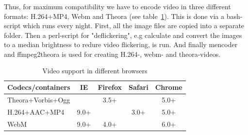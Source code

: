 Thus, for maximum compatibility we have to encode video in three different formats: H.264+MP4, Webm and Theora (see table~\ref{tab:videosupport}). This is done via a bash-script which runs every night. First, all the image files are copied into a separate folder. Then a perl-script for "deflickering", e.g calculate and convert the images to a median brightness to redure video flickering, is run. And finally mencoder and ffmpeg2theora is used for creating H.264-, webm- and theora-videos.  

\begin{table}\centering
\begin{tabular}{@{}lcccc@{}} \toprule
Codecs/containers & IE & Firefox & Safari & Chrome \\ \midrule
Theora+Vorbis+Ogg & ~                 & 3.5+    & ~      & 5.0+   \\ 
H.264+AAC+MP4     & 9.0+              & ~       & 3.0+   & 5.0+   \\ 
WebM              & 9.0+              & 4.0+    & ~      & 6.0+   \\ \bottomrule
\end{tabular}
\caption{Video support in different browsers \citep{pilgrim2010html5}}
\label{tab:videosupport}
\end{table}









